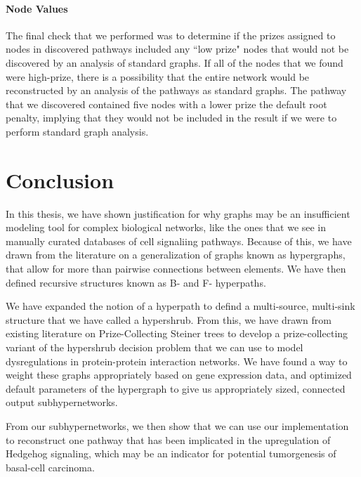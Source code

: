 \documentclass[12pt,twoside]{reedthesis}
\theoremstyle{definition}
\begin{document}
   \subsubsection{Node Values}

   The final check that we performed was to determine if the prizes assigned to nodes in discovered pathways included any ``low prize" nodes that would not be discovered by an analysis of standard graphs. If all of the nodes that we found were high-prize, there is a possibility that the entire network would be reconstructed by an analysis of the pathways as standard graphs. The pathway that we discovered contained five nodes with a lower prize the default root penalty, implying that they would not be included in the result if we were to perform standard graph analysis.

\chapter*{Conclusion}
	\setcounter{chapter}{5}
	\setcounter{section}{0}

  In this thesis, we have shown justification for why graphs may be an insufficient modeling tool for complex biological networks, like the ones that we see in manually curated databases of cell signaliing pathways. Because of this, we have drawn from the literature on a generalization of graphs known as hypergraphs, that allow for more than pairwise connections between elements. We have then defined recursive structures known as B- and F- hyperpaths.\par

  We have expanded the notion of a hyperpath to defind a multi-source, multi-sink structure that we have called a hypershrub. From this, we have drawn from existing literature on Prize-Collecting Steiner trees to develop a prize-collecting variant of the hypershrub decision problem that we can use to model dysregulations in protein-protein interaction networks. We have found a way to weight these graphs appropriately based on gene expression data, and optimized default parameters of the hypergraph to give us appropriately sized, connected output subhypernetworks.\par

  From our subhypernetworks, we then show that we can use our implementation to reconstruct one pathway that has been implicated in the upregulation of Hedgehog signaling, which may be an indicator for potential tumorgenesis of basal-cell carcinoma.
\end{document}
